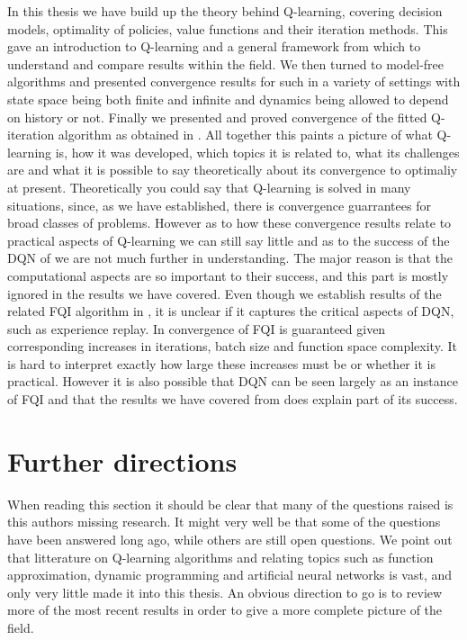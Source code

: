 In this thesis we have build up the theory behind Q-learning,
covering decision models, optimality of policies,
value functions and their iteration methods.
This gave an introduction to Q-learning 
and a general framework from which to understand
and compare results within the field.
We then turned to model-free algorithms 
and presented convergence results for such in a variety
of settings with state space being both finite and infinite and
dynamics being allowed to depend on history or not.
Finally we presented and proved convergence of the fitted Q-iteration
algorithm as obtained in .
All together this paints a picture of what Q-learning is,
how it was developed, which topics it is related to,
what its challenges are and what it is possible to
say theoretically about its convergence to optimaliy at present.
Theoretically you could say that Q-learning is solved in many situations,
since, as we have established,
there is convergence guarrantees for broad classes of problems.
However as to how these convergence results relate to practical aspects of
Q-learning we can still say little and as to the success of the DQN of
 we are not much further in understanding.
The major reason is that the computational aspects are so important to their 
success, and this part is mostly ignored in the results we have covered.
Even though we establish results of the related FQI algorithm in ,
it is unclear if it captures the critical aspects of DQN,
such as experience replay.
In  convergence of FQI is guaranteed given corresponding
increases in iterations, batch size and function space complexity.
It is hard to interpret exactly how large these increases must be
or whether it is practical.
However it is also possible that DQN can be seen largely as an instance of FQI 
and that the results we have covered from  does explain
part of its success.

\section{Further directions}
When reading this section it should be clear that many of the questions
raised is this authors missing research. It might very well be
that some of the questions have been answered long ago, while others
are still open questions.
We point out that
litterature on Q-learning algorithms and relating topics such as 
function approximation, dynamic programming and artificial neural networks
is vast, and only very little made it into this thesis. 
An obvious direction to go is to review more of the most recent results
in order to give a more complete picture of the field.

